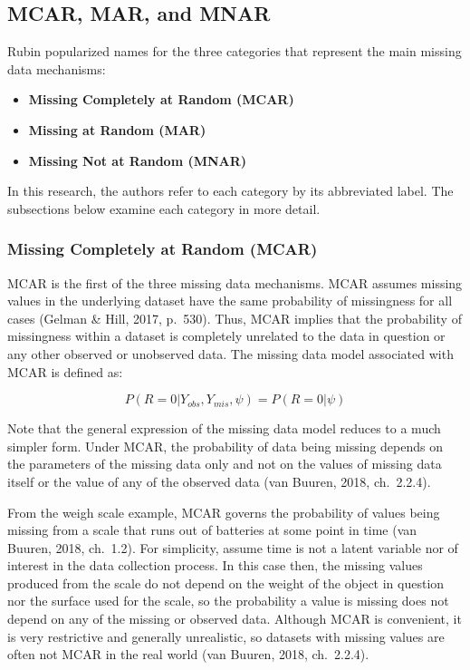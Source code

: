\documentclass[12pt,oneside]{chicagocapstone}
\providecommand{\tightlist}{%
  \setlength{\itemsep}{0pt}\setlength{\parskip}{0pt}}
\begin{document}
\subsection*{MCAR, MAR, and MNAR}\label{background-mcar-mar-mnar}

Rubin popularized names for the three categories that represent the main
missing data mechanisms:
\begin{itemize}
\tightlist
\item
  \textbf{Missing Completely at Random (MCAR)}
\item
  \textbf{Missing at Random (MAR)}
\item
  \textbf{Missing Not at Random (MNAR)}
\end{itemize}
In this research, the authors refer to each category by its abbreviated
label. The subsections below examine each category in more detail.

\subsubsection*{Missing Completely at Random (MCAR)}\label{mcar}

MCAR is the first of the three missing data mechanisms. MCAR assumes
missing values in the underlying dataset have the same probability of
missingness for all cases (Gelman \& Hill, 2017, p.~530). Thus, MCAR
implies that the probability of missingness within a dataset is
completely unrelated to the data in question or any other observed or
unobserved data. The missing data model associated with MCAR is defined
as:

\[P(R=0|Y_{obs},Y_{mis},\psi) = P(R=0|\psi)\]

Note that the general expression of the missing data model reduces to a
much simpler form. Under MCAR, the probability of data being missing
depends on the parameters of the missing data only and not on the values
of missing data itself or the value of any of the observed data (van
Buuren, 2018, ch.~2.2.4).

From the weigh scale example, MCAR governs the probability of values
being missing from a scale that runs out of batteries at some point in
time (van Buuren, 2018, ch.~1.2). For simplicity, assume time is not a
latent variable nor of interest in the data collection process. In this
case then, the missing values produced from the scale do not depend on
the weight of the object in question nor the surface used for the scale,
so the probability a value is missing does not depend on any of the
missing or observed data. Although MCAR is convenient, it is very
restrictive and generally unrealistic, so datasets with missing values
are often not MCAR in the real world (van Buuren, 2018, ch.~2.2.4).
\end{document}
